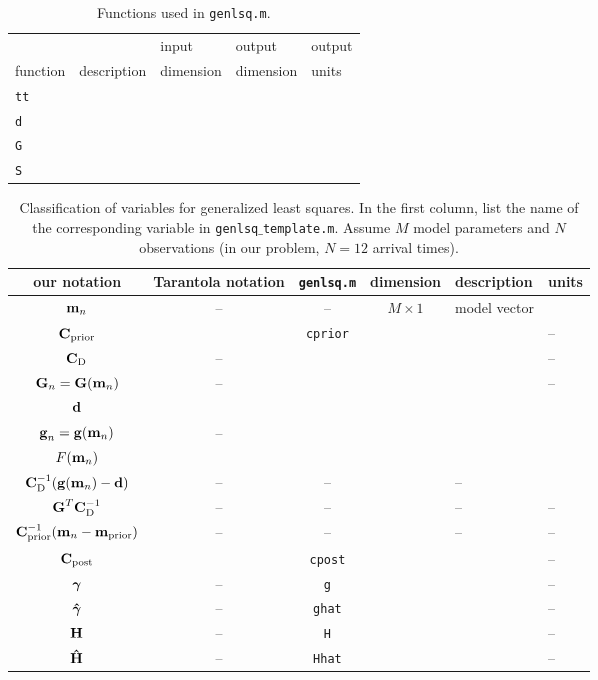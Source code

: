 \begin{table}[h]
\centering
\caption[]{{
Functions used in {\tt genlsq.m}.
\label{tab:funs}
}}
\begin{spacing}{3}
\begin{tabular}{l|l|l|l|l}
\hline
         &                          & input     & output    & output \\
function & description \hspace{4cm} & dimension & dimension & units \hspace{0.5cm} \\
\hline\hline 
\verb+tt+ & & & & \\ \hline
\verb+d+  & & & & \\ \hline
\verb+G+  & & & & \\ \hline
\verb+S+  & & & & \\ \hline
\end{tabular}
\end{spacing}
\end{table}

\begin{table}[h]
\caption[]{{
Classification of variables for generalized least squares. In the first column, list the name of the corresponding variable in {\tt genlsq$\_$template.m}. Assume $M$ model parameters and $N$ observations (in our problem, $N=12$ arrival times).
\label{tab:vars}
}}
\begin{spacing}{1.4}
\hspace{-1cm}
\begin{tabular}{c|c|c|c|l|l}
\hline
our notation & Tarantola notation & {\tt genlsq.m} & dimension & description \hspace{2cm} & units \hspace{0.5cm} \\
\hline\hline 
$\mbox{${\bf m}$}_n$
& --
& --
& $M \times 1$ 
& model vector
&
\\ \hline
$\mbox{${\bf C}$}_{\rm prior}$
& 
& \verb+cprior+
&
&
& --
\\ \hline
$\mbox{${\bf C}$}_{\rm D}$
& --
&
&
&
& --
\\ \hline
$\mbox{${\bf G}$}_n = \mbox{${\bf G}$}(\mbox{${\bf m}$}_n)$
& --
& 
&
&
& --
\\ \hline
$\mbox{${\bf d}$}$
&
&
&
& 
\\ \hline
$\mbox{${\bf g}$}_n = \mbox{${\bf g}$}(\mbox{${\bf m}$}_n)$
& --
&
&
& 
\\ \hline
\hline
$F(\mbox{${\bf m}$}_n)$
&
&
&
&
\\ \hline
$\mbox{${\bf C}$}_{\rm D}^{-1} (\mbox{${\bf g}$}(\mbox{${\bf m}$}_n) - \mbox{${\bf d}$})$
& --
& --
&
& --
\\ \hline
$\mbox{${\bf G}$}^T\mbox{${\bf C}$}_{\rm D}^{-1}$
& --
& --
&
& --
& --
\\ \hline
$\mbox{${\bf C}$}_{\rm prior}^{-1} (\mbox{${\bf m}$}_n - \mbox{${\bf m}$}_{\rm prior})$
& --
& --
&
& --
& --
\\ \hline
\hline
$\mbox{${\bf C}$}_{\rm post}$
& 
& \verb+cpost+
&
& 
& --
\\ \hline
$\mbox{\boldmath $\bf \gamma$}$
& --
& \verb+g+
&
&
& --
\\ \hline
$\mbox{\boldmath{$\hat{\gamma}$}}$
& --
& \verb+ghat+
&
&
& --
\\ \hline
$\mbox{${\bf H}$}$
& --
& \verb+H+
&
&
& --
\\ \hline
$\mbox{\boldmath{$\hat{\rm H}$}}$
& --
& \verb+Hhat+
&
&
& --
\\ \hline
\hline
\end{tabular}
\end{spacing}
\end{table}
